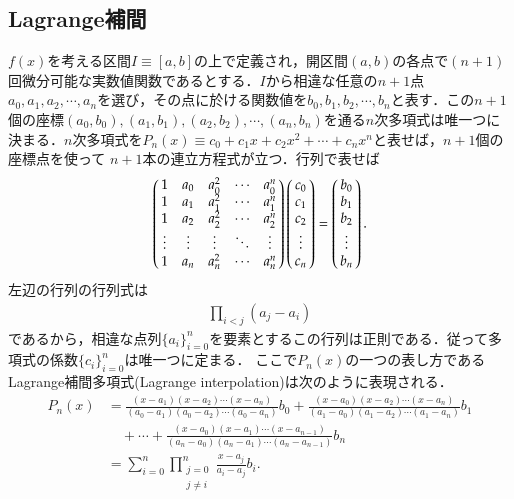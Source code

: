 \documentclass[a4j,papersize,disablejfam,slide,14pt]{jsarticle}
\begin{document}
\subsection{{\rm Lagrange}補間}
	$f(x)$を考える区間$I \equiv [a,b]$の上で定義され，開区間$(a,b)$の各点で$(n+1)$回微分可能な実数値関数であるとする．$I$から相違な任意の$n+1$点
    $a_0, a_1, a_2, \cdots, a_n$を選び，その点に於ける関数値を$b_0, b_1, b_2, \cdots, b_n$と表す．この$n+1$個の座標$(a_0, b_0), (a_1, b_1), (a_2, b_2),
    \cdots, (a_n, b_n)$を通る$n$次多項式は唯一つに決まる．$n$次多項式を$P_n(x)\equiv c_0 + c_1 x + c_2 x^2 + \cdots + c_n x^n$と表せば，$n+1$個の座標点を使って
    $n+1$本の連立方程式が立つ．行列で表せば
    \begin{align}
    	\left(
    	\begin{array}{@{\,}ccccc@{\,}}
    		1 & a_0 & a_0^2 & \cdots & a_0^n \\
            1 & a_1 & a_1^2 & \cdots & a_1^n \\
            1 & a_2 & a_2^2 & \cdots & a_2^n \\
            \vdots & \vdots & \vdots & \ddots & \vdots \\
            1 & a_n & a_n^2 & \cdots & a_n^n
    	\end{array}
    	\right)
        \left(
    	\begin{array}{@{\,}c@{\,}}
    		c_0 \\
            c_1 \\
            c_2 \\
            \vdots \\
            c_n
    	\end{array}
    	\right)
    	= \left(
    	\begin{array}{@{\,}c@{\,}}
    		b_0 \\
            b_1 \\
            b_2 \\
            \vdots \\
            b_n
    	\end{array}
    	\right).
    \end{align}
    左辺の行列の行列式は
    \begin{align}
    	\prod_{i < j} (a_j - a_i)
    \end{align}
    であるから，相違な点列$\{a_i\}_{i=0}^{n}$を要素とするこの行列は正則である．従って多項式の係数$\{c_i\}_{i=0}^{n}$は唯一つに定まる．
    ここで$P_n(x)$の一つの表し方である{\rm Lagrange}補間多項式({\rm Lagrange interpolation})は次のように表現される．
    \begin{align}
    	P_n(x) &= \frac{(x-a_1)(x-a_2)\cdots(x-a_n)}{(a_0-a_1)(a_0-a_2)\cdots(a_0-a_n)}b_0 + \frac{(x-a_0)(x-a_2)\cdots(x-a_n)}{(a_1-a_0)(a_1-a_2)\cdots(a_1-a_n)}b_1 \\
        &\quad + \cdots + \frac{(x-a_0)(x-a_1)\cdots(x-a_{n-1})}{(a_n-a_0)(a_n-a_1)\cdots(a_n-a_{n-1})}b_n\\
        &= \sum_{i=0}^{n} \prod_{\substack{j=0\\j \neq i}}^{n} \frac{x-a_j}{a_i - a_j} b_i.
    \end{align}
\end{document}
